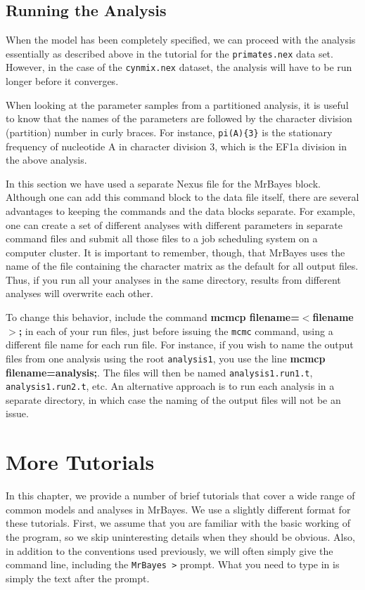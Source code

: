 \documentclass[12pt]{book}
\begin{document}
\section{Running the Analysis}

When the model has been completely specified, we can proceed with the analysis essentially as described 
above in the tutorial for the \texttt{primates.nex} data set. However, in the case of the 
\texttt{cynmix.nex} dataset, the analysis will have to be run longer before it converges.

When looking at the parameter samples from a partitioned analysis, it is useful to know that the names of 
the parameters are followed by the character division (partition) number in curly braces. For instance, 
\texttt{pi(A)\{3\}} is the stationary frequency of nucleotide A in character division 3, which is the EF1a 
division in the above analysis.

In this section we have used a separate Nexus file for the MrBayes block. Although one can add this command 
block to the data file itself, there are several advantages to keeping the commands and the data blocks 
separate. For example, one can create a set of different analyses with different parameters in separate 
command files and submit all those files to a job scheduling system on a computer cluster. It is important 
to remember, though, that MrBayes uses the name of the file containing the character matrix as the default 
for all output files. Thus, if you run all your analyses in the same directory, results from different 
analyses will overwrite each other.

To change this behavior, include the command \textbf{mcmcp filename=$<$filename$>$;} in each of your run 
files, just before issuing the \texttt{mcmc} command, using a different file name for each run file. For 
instance, if you wish to name the output files from one analysis using the root \texttt{analysis1}, you use 
the line \textbf{mcmcp filename=analysis;}. The files will then be named \texttt{analysis1.run1.t}, 
\texttt{analysis1.run2.t}, etc. An alternative approach is to run each analysis in a separate directory, in 
which case the naming of the output files will not be an issue.

\chapter{More Tutorials}
\label{tutorialAdvanced}

In this chapter, we provide a number of brief tutorials that cover a wide range of common
models and analyses in MrBayes. We use a slightly different format for these tutorials.
First, we assume that you are familiar with the basic working of the program, so we skip
uninteresting details when they should be obvious. Also, in addition to the conventions used previously, we will
often simply give the command line, including the \texttt{MrBayes >} prompt. What you need to type
in is simply the text after the prompt.
\end{document}
